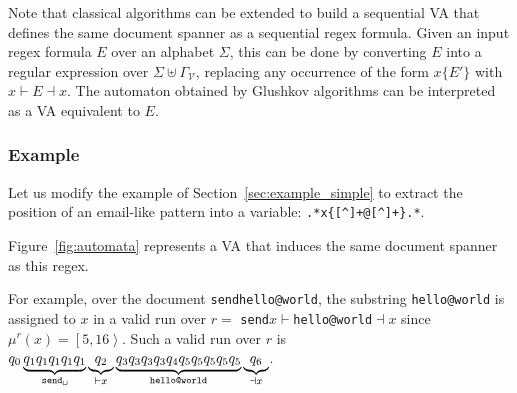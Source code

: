 \documentclass[12px]{article}
\theoremstyle{definition}
\newcommand{\Span}[1]{\left[ #1 \right\rangle}
\begin{document}

        Note that classical algorithms can be extended to build a sequential VA
        that defines the same document spanner as a sequential regex formula.
        Given an input regex formula $E$ over an alphabet $\Sigma$, this can be
        done by converting $E$ into a regular expression over $\Sigma \uplus
        \Gamma_\mathcal{V}$, replacing any occurrence of the form $x\{E'\}$
        with $x{\vdash} E {\dashv}x$. The automaton obtained by Glushkov
        algorithms can be interpreted as a VA equivalent to $E$.

      \subsubsection{Example}

        Let us modify the example of Section~\ref{sec:example_simple} to
        extract the position of an email-like pattern into a variable:
        \texttt{.*x\{[\textasciicircum\textvisiblespace]+@[\textasciicircum\textvisiblespace]+\}.*}.

        Figure~\ref{fig:automata} represents a VA that induces the same
        document spanner as this regex.

        For example, over the document
        \texttt{send{\textvisiblespace}hello@world}, the substring
        \texttt{hello@world} is assigned to $x$ in a valid run over $r =$
        \texttt{send{\textvisiblespace}$x{\vdash}$hello@world${\dashv}x$} since
        $\mu^r(x) = \Span{5, 16}$. Such a valid run over $r$ is $q_0
        \underbrace{q_1 q_1 q_1 q_1 q_1}_\texttt{send\textvisiblespace}
        \underbrace{q_2}_{{\vdash}x} \underbrace{q_3 q_3 q_3 q_3 q_4 q_5 q_5
        q_5 q_5 q_5}_\texttt{hello@world} \underbrace{q_6}_{{\dashv}x}$.
\end{document}
